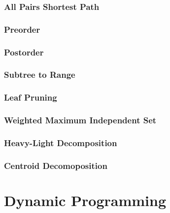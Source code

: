 \documentclass{article}
\begin{document}
\subsubsection{All Pairs Shortest Path}

\subsubsection{Preorder}

\subsubsection{Postorder}

\subsubsection{Subtree to Range}

\subsubsection{Leaf Pruning}

\subsubsection{Weighted Maximum Independent Set}

\subsubsection{Heavy-Light Decomposition}

\subsubsection{Centroid Decomoposition}


\section{Dynamic Programming}
\end{document}
